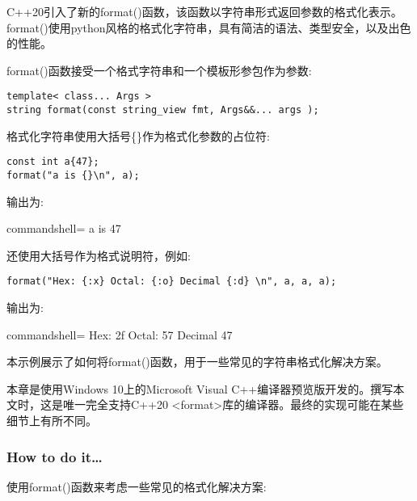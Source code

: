 
C++20引入了新的format()函数，该函数以字符串形式返回参数的格式化表示。format()使用python风格的格式化字符串，具有简洁的语法、类型安全，以及出色的性能。

format()函数接受一个格式字符串和一个模板形参包作为参数:

\begin{lstlisting}[style=styleCXX]
template< class... Args >
string format(const string_view fmt, Args&&... args );
\end{lstlisting}

格式化字符串使用大括号\{\}作为格式化参数的占位符:

\begin{lstlisting}[style=styleCXX]
const int a{47};
format("a is {}\n", a);
\end{lstlisting}

输出为:

\begin{tcblisting}{commandshell={}}
a is 47
\end{tcblisting}

还使用大括号作为格式说明符，例如:

\begin{lstlisting}[style=styleCXX]
	format("Hex: {:x} Octal: {:o} Decimal {:d} \n", a, a, a);
\end{lstlisting}

输出为:

\begin{tcblisting}{commandshell={}}
Hex: 2f Octal: 57 Decimal 47
\end{tcblisting}

本示例展示了如何将format()函数，用于一些常见的字符串格式化解决方案。

\begin{tcolorbox}[colback=webgreen!5!white,colframe=webgreen!75!black,title=Note]
本章是使用Windows 10上的Microsoft Visual C++编译器预览版开发的。撰写本文时，这是唯一完全支持C++20 <format>库的编译器。最终的实现可能在某些细节上有所不同。
\end{tcolorbox}

\subsubsection{How to do it…}

使用format()函数来考虑一些常见的格式化解决方案:

